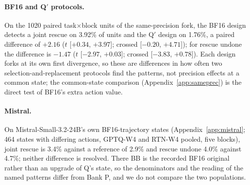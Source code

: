 \paragraph{BF16 and Q$'$ protocols.} On the 1020 paired task$\times$block units of the same-precision fork, the BF16 design detects a joint rescue on 3.92\% of units and the Q$'$ design on 1.76\%, a paired difference of $+2.16$\pp{} ($t$ [$+0.34$, $+3.97$]; crossed [$-0.20$, $+4.71$]); for rescue undone the difference is $-1.47$ ($t$ [$-2.97$, $+0.03$]; crossed [$-3.83$, $+0.78$]). Each design forks at its own first divergence, so these are differences in how often two selection-and-replacement protocols find the patterns, not precision effects at a common state; the common-state comparison (Appendix~\ref{app:sameprec}) is the direct test of BF16's extra action value. %


\paragraph{Mistral.} On Mistral-Small-3.2-24B's own BF16-trajectory states (Appendix~\ref{app:mistral}; 464 states with differing actions, GPTQ-W4 and RTN-W4 pooled, five blocks), joint rescue is 3.4\% against a reference of 2.9\% and rescue undone 4.0\% against 4.7\%; neither difference is resolved. There BB is the recorded BF16 original rather than an upgrade of Q's state, so the denominators and the reading of the named patterns differ from Bank P, and we do not compare the two populations. %


